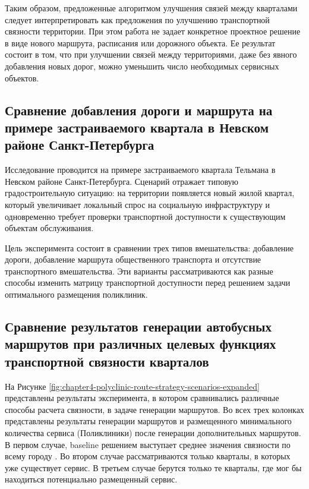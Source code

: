 \documentclass[14pt,a4paper]{extarticle}
\begin{document}
Таким образом, предложенные алгоритмом улучшения связей между кварталами следует интерпретировать как предложения по улучшению транспортной связности территории. При этом работа не задает конкретное проектное решение в виде нового маршрута, расписания или дорожного объекта. Ее результат состоит в том, что при улучшении связей между территориями, даже без явного добавления новых дорог, можно уменьшить число необходимых сервисных объектов.

\subsection*{Сравнение добавления дороги и маршрута на примере застраиваемого квартала в Невском районе Санкт-Петербурга}

Исследование проводится на примере застраиваемого квартала Тельмана в Невском районе Санкт-Петербурга. Сценарий отражает типовую градостроительную ситуацию: на территории появляется новый жилой квартал, который увеличивает локальный спрос на социальную инфраструктуру и одновременно требует проверки транспортной доступности к существующим объектам обслуживания.

Цель эксперимента состоит в сравнении трех типов вмешательства: добавление дороги, добавление маршрута общественного транспорта и отсутствие транспортного вмешательства. Эти варианты рассматриваются как разные способы изменить матрицу транспортной доступности перед решением задачи оптимального размещения поликлиник.

\subsection*{Сравнение результатов генерации автобусных маршрутов при различных целевых функциях транспортной связности кварталов}

На Рисунке \ref{fig:chapter4-polyclinic-route-strategy-scenarios-expanded} представлены результаты эксперимента, в котором сравнивались различные способы расчета связности, в задаче генерации маршрутов. Во всех трех колонках представлены результаты генерации маршрутов и размещенного минимального количества сервиса (Поликлиники) после генерации дополнительных маршрутов. В первом случае, baseline решением выступает среднее значения связности по всему городу \cite{morozov2026oneRuleTndp}. Во втором случае рассматриваются только кварталы, в которых уже существует сервис. В третьем случае берутся только те кварталы, где мог бы находиться потенциально размещенный сервис.
\end{document}
